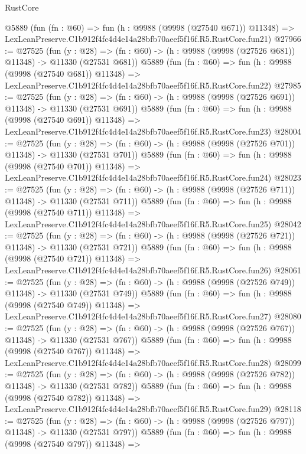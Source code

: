\begin{lexlean}{RustCore}
\begin{coremodule}
    @5889
    (fun (fn : @60) =>
    fun (h : @9988 (@9998 (@27540 @671)) @11348) =>
    LexLeanPreserve.C1b912f4fc4d4e14a28bfb70aeef5f16f.R5.RustCore.fun21)
@27966 := @27525
    (fun (y : @28) =>
    (fn : @60) -> (h : @9988 (@9998 (@27526 @681)) @11348) -> @11330 (@27531 @681))
    @5889
    (fun (fn : @60) =>
    fun (h : @9988 (@9998 (@27540 @681)) @11348) =>
    LexLeanPreserve.C1b912f4fc4d4e14a28bfb70aeef5f16f.R5.RustCore.fun22)
@27985 := @27525
    (fun (y : @28) =>
    (fn : @60) -> (h : @9988 (@9998 (@27526 @691)) @11348) -> @11330 (@27531 @691))
    @5889
    (fun (fn : @60) =>
    fun (h : @9988 (@9998 (@27540 @691)) @11348) =>
    LexLeanPreserve.C1b912f4fc4d4e14a28bfb70aeef5f16f.R5.RustCore.fun23)
@28004 := @27525
    (fun (y : @28) =>
    (fn : @60) -> (h : @9988 (@9998 (@27526 @701)) @11348) -> @11330 (@27531 @701))
    @5889
    (fun (fn : @60) =>
    fun (h : @9988 (@9998 (@27540 @701)) @11348) =>
    LexLeanPreserve.C1b912f4fc4d4e14a28bfb70aeef5f16f.R5.RustCore.fun24)
@28023 := @27525
    (fun (y : @28) =>
    (fn : @60) -> (h : @9988 (@9998 (@27526 @711)) @11348) -> @11330 (@27531 @711))
    @5889
    (fun (fn : @60) =>
    fun (h : @9988 (@9998 (@27540 @711)) @11348) =>
    LexLeanPreserve.C1b912f4fc4d4e14a28bfb70aeef5f16f.R5.RustCore.fun25)
@28042 := @27525
    (fun (y : @28) =>
    (fn : @60) -> (h : @9988 (@9998 (@27526 @721)) @11348) -> @11330 (@27531 @721))
    @5889
    (fun (fn : @60) =>
    fun (h : @9988 (@9998 (@27540 @721)) @11348) =>
    LexLeanPreserve.C1b912f4fc4d4e14a28bfb70aeef5f16f.R5.RustCore.fun26)
@28061 := @27525
    (fun (y : @28) =>
    (fn : @60) -> (h : @9988 (@9998 (@27526 @749)) @11348) -> @11330 (@27531 @749))
    @5889
    (fun (fn : @60) =>
    fun (h : @9988 (@9998 (@27540 @749)) @11348) =>
    LexLeanPreserve.C1b912f4fc4d4e14a28bfb70aeef5f16f.R5.RustCore.fun27)
@28080 := @27525
    (fun (y : @28) =>
    (fn : @60) -> (h : @9988 (@9998 (@27526 @767)) @11348) -> @11330 (@27531 @767))
    @5889
    (fun (fn : @60) =>
    fun (h : @9988 (@9998 (@27540 @767)) @11348) =>
    LexLeanPreserve.C1b912f4fc4d4e14a28bfb70aeef5f16f.R5.RustCore.fun28)
@28099 := @27525
    (fun (y : @28) =>
    (fn : @60) -> (h : @9988 (@9998 (@27526 @782)) @11348) -> @11330 (@27531 @782))
    @5889
    (fun (fn : @60) =>
    fun (h : @9988 (@9998 (@27540 @782)) @11348) =>
    LexLeanPreserve.C1b912f4fc4d4e14a28bfb70aeef5f16f.R5.RustCore.fun29)
@28118 := @27525
    (fun (y : @28) =>
    (fn : @60) -> (h : @9988 (@9998 (@27526 @797)) @11348) -> @11330 (@27531 @797))
    @5889
    (fun (fn : @60) =>
    fun (h : @9988 (@9998 (@27540 @797)) @11348) =>

\end{coremodule}
\end{lexlean}
